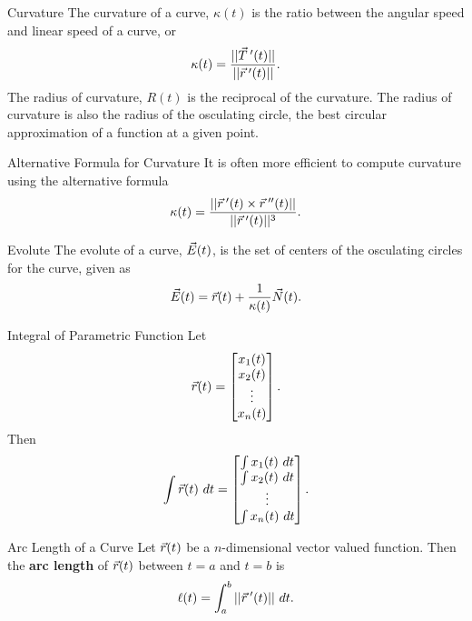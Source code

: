\begin{definition}{Curvature}
The curvature of a curve, $\kappa(t)$ is the ratio between the angular speed and linear speed of a curve, or $$\kappa(t)=\frac{||\vec{T}\hspace{0.2em}'(t) ||}{||\vec{r}\hspace{0.2em}'(t) ||}. $$ The radius of curvature, $R(t)$ is the reciprocal of the curvature. The radius of curvature is also the radius of the osculating circle, the best circular approximation of a function at a given point.
\end{definition}

\begin{definition}{Alternative Formula for Curvature}
It is often more efficient to compute curvature using the alternative formula $$\kappa(t)=\frac{||\vec{r}\hspace{0.2em}'(t)\times\vec{r}\hspace{0.2em}''(t) ||}{||\vec{r}\hspace{0.2em}'(t) ||^3}.$$
\end{definition}

\begin{definition}{Evolute}
The evolute of a curve, $\vec{E}(t)$, is the set of centers of the osculating circles for the curve, given as $$\vec{E}(t)=\vec{r}(t)+\frac{1}{\kappa(t)}\vec{N}(t). $$
\end{definition}

\begin{definition}{Integral of Parametric Function}
Let $$\vec{r}(t)=\begin{bmatrix}x_1(t)\\x_2(t)\\\vdots\\x_n(t)\end{bmatrix}.$$ Then $$\int\vcr(t)\ dt=\bmat{\int x_1(t) \ dt\\\int x_2(t)\ dt\\\vdots\\\int x_n(t)\ dt}. $$
\end{definition}

\begin{definition}{Arc Length of a Curve}
Let $\vec{r}(t)$ be a $n$-dimensional vector valued function. Then the \textbf{arc length} of $\vec{r}(t)$ between $t=a$ and $t=b$ is $$\ell(t)=\int_{a}^{b} ||\vec{r}\hspace{0.2em}'(t)|| \ dt. $$
\end{definition}



\renewcommand\thesubsection{\thesection.\arabic{subsection}}